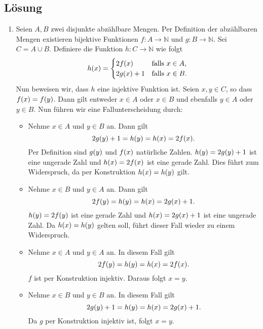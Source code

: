 \documentclass[german,12pt]{homework}
\newcommand{\NN}{\mathbb{N}}
\DeclarePairedDelimiter{\enbrace}{(}{)}
\begin{document}
    \subsection*{Lösung}
    \begin{enumerate}
        \item Seien \(A, B\) zwei disjunkte abzählbare Mengen. Per Definition der abzählbaren Mengen existieren bijektive Funktionen \(f: A \to \NN\) und \(g: B \to \NN\). Sei \(C = A \cup B\). Definiere die Funktion \(h: C \to \NN\) wie folgt
        \[h\enbrace*{x} = \begin{cases}
            2f\enbrace*{x} & \text{falls }x \in A,\\
            2g\enbrace*{x} + 1 & \text{falls }x \in B.
        \end{cases}\]
        Nun beweisen wir, dass \(h\) eine injektive Funktion ist. Seien \(x, y \in C\), so dass \(f\enbrace*{x} = f\enbrace*{y}\). Dann gilt entweder \(x \in A\) oder \(x \in B\) und ebenfalls \(y \in A\) oder \(y \in B\). Nun führen wir eine Fallunterscheidung durch:
        \begin{itemize}
            \item Nehme \(x \in A\) und \(y \in B\) an. Dann gilt
            \[2g\enbrace*{y} + 1 = h\enbrace*{y} = h\enbrace*{x} = 2f\enbrace*{x}.\]
            Per Definition sind \(g\enbrace*{y}\) und \(f\enbrace*{x}\) natürliche Zahlen. \(h\enbrace*{y} = 2g\enbrace*{y} + 1\) ist eine ungerade Zahl und \(h\enbrace*{x} = 2f\enbrace*{x}\) ist eine gerade Zahl. Dies führt zum Widerspruch, da per Konstruktion \(h\enbrace*{x} = h\enbrace*{y}\) gilt.
            \item Nehme \(x \in B\) und \(y \in A\) an. Dann gilt
            \[2f\enbrace*{y} = h\enbrace*{y} = h\enbrace*{x} = 2g\enbrace*{x} + 1.\]
            \(h\enbrace*{y} = 2f\enbrace*{y}\) ist eine gerade Zahl und \(h\enbrace*{x} = 2g\enbrace*{x} + 1\) ist eine ungerade Zahl. Da \(h\enbrace*{x} = h\enbrace*{y}\) gelten soll, führt dieser Fall wieder zu einem Widerspruch.
            \item Nehme \(x \in A\) und \(y \in A\) an. In diesem Fall gilt
            \[2f\enbrace*{y} = h\enbrace*{y} = h\enbrace*{x} = 2f\enbrace*{x}.\]
            \(f\) ist per Konstruktion injektiv. Daraus folgt \(x = y\).
            \item Nehme \(x \in B\) und \(y \in B\) an. In diesem Fall gilt
            \[2g\enbrace*{y} + 1 = h\enbrace*{y} = h\enbrace*{x} = 2g\enbrace*{x} + 1.\]
            Da \(g\) per Konstruktion injektiv ist, folgt \(x = y\).

\end{itemize}
\end{enumerate}
\end{document}
